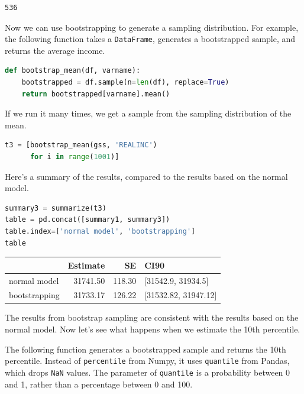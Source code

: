 \begin{lstlisting}[]
536
\end{lstlisting}

Now we can use bootstrapping to generate a sampling distribution. For
example, the following function takes a
\passthrough{\lstinline!DataFrame!}, generates a bootstrapped sample,
and returns the average income.

\begin{lstlisting}[language=Python]
def bootstrap_mean(df, varname):
    bootstrapped = df.sample(n=len(df), replace=True)
    return bootstrapped[varname].mean()
\end{lstlisting}

If we run it many times, we get a sample from the sampling distribution
of the mean.

\begin{lstlisting}[language=Python]
t3 = [bootstrap_mean(gss, 'REALINC')
      for i in range(1001)]
\end{lstlisting}

Here's a summary of the results, compared to the results based on the
normal model.

\begin{lstlisting}[language=Python]
summary3 = summarize(t3)
table = pd.concat([summary1, summary3])
table.index=['normal model', 'bootstrapping']
table
\end{lstlisting}

\begin{tabular}{lrrl}
\toprule
{} &  Estimate &      SE &                  CI90 \\
\midrule
normal model  &  31741.50 &  118.30 &    [31542.9, 31934.5] \\
bootstrapping &  31733.17 &  126.22 &  [31532.82, 31947.12] \\
\bottomrule
\end{tabular}

The results from bootstrap sampling are consistent with the results
based on the normal model. Now let's see what happens when we estimate
the 10th percentile.

The following function generates a bootstrapped sample and returns the
10th percentile. Instead of \passthrough{\lstinline!percentile!} from
Numpy, it uses \passthrough{\lstinline!quantile!} from Pandas, which
drops \passthrough{\lstinline!NaN!} values. The parameter of
\passthrough{\lstinline!quantile!} is a probability between 0 and 1,
rather than a percentage between 0 and 100.

